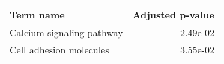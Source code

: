 \begin{tabular}{lr}
\toprule
                 Term name &  Adjusted p-value \\
\midrule
 Calcium signaling pathway &          2.49e-02 \\
   Cell adhesion molecules &          3.55e-02 \\
\bottomrule
\end{tabular}
